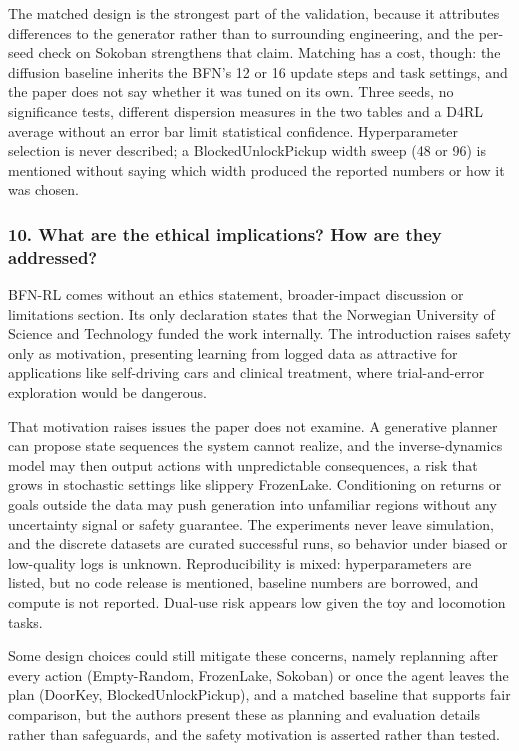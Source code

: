 \documentclass[11pt]{article}
\newcommand{\question}[1]{\subsubsection*{#1}}
\begin{document}
The matched design is the strongest part of the validation, because it attributes differences to the generator rather than to surrounding engineering, and the per-seed check on Sokoban strengthens that claim. Matching has a cost, though: the diffusion baseline inherits the BFN's 12 or 16 update steps and task settings, and the paper does not say whether it was tuned on its own. Three seeds, no significance tests, different dispersion measures in the two tables and a D4RL average without an error bar limit statistical confidence. Hyperparameter selection is never described; a BlockedUnlockPickup width sweep (48 or 96) is mentioned without saying which width produced the reported numbers or how it was chosen.

\question{10. What are the ethical implications? How are they addressed?}

BFN-RL comes without an ethics statement, broader-impact discussion or limitations section. Its only declaration states that the Norwegian University of Science and Technology funded the work internally. The introduction raises safety only as motivation, presenting learning from logged data as attractive for applications like self-driving cars and clinical treatment, where trial-and-error exploration would be dangerous.

That motivation raises issues the paper does not examine. A generative planner can propose state sequences the system cannot realize, and the inverse-dynamics model may then output actions with unpredictable consequences, a risk that grows in stochastic settings like slippery FrozenLake. Conditioning on returns or goals outside the data may push generation into unfamiliar regions without any uncertainty signal or safety guarantee. The experiments never leave simulation, and the discrete datasets are curated successful runs, so behavior under biased or low-quality logs is unknown. Reproducibility is mixed: hyperparameters are listed, but no code release is mentioned, baseline numbers are borrowed, and compute is not reported. Dual-use risk appears low given the toy and locomotion tasks.

Some design choices could still mitigate these concerns, namely replanning after every action (Empty-Random, FrozenLake, Sokoban) or once the agent leaves the plan (DoorKey, BlockedUnlockPickup), and a matched baseline that supports fair comparison, but the authors present these as planning and evaluation details rather than safeguards, and the safety motivation is asserted rather than tested.
\end{document}
